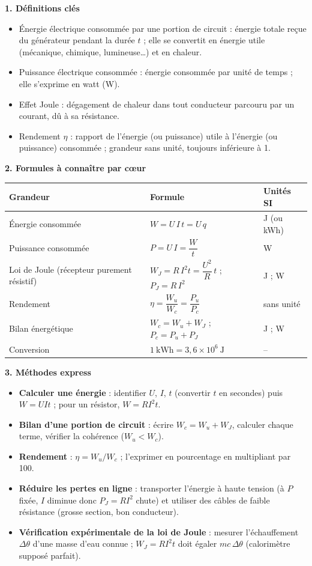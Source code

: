 \documentclass[11pt]{article}
\newcommand{\cle}[1]{{\popxbold\color{popdark}#1}}
\begin{document}
\begin{bilan}
\textbf{1. Définitions clés}
\begin{itemize}
\item \cle{Énergie électrique consommée} par une portion de circuit : énergie totale reçue du générateur pendant la durée $t$ ; elle se convertit en énergie utile (mécanique, chimique, lumineuse\ldots) et en chaleur.
\item \cle{Puissance électrique consommée} : énergie consommée par unité de temps ; elle s'exprime en watt (W).
\item \cle{Effet Joule} : dégagement de chaleur dans tout conducteur parcouru par un courant, dû à sa résistance.
\item \cle{Rendement} $\eta$ : rapport de l'énergie (ou puissance) utile à l'énergie (ou puissance) consommée ; grandeur sans unité, toujours inférieure à 1.
\end{itemize}

\textbf{2. Formules à connaître par c\oe ur}
\begin{center}
\begin{tabularx}{\linewidth}{|l|X|l|}
\hline
\rowcolor{popblueL} \textbf{Grandeur} & \textbf{Formule} & \textbf{Unités SI} \\
\hline
Énergie consommée & $W = U\,I\,t = U\,q$ & J (ou kWh) \\
\hline
Puissance consommée & $P = U\,I = \dfrac{W}{t}$ & W \\
\hline
Loi de Joule (récepteur purement résistif) & $W_J = R\,I^2 t = \dfrac{U^2}{R}\,t$ \;;\; $P_J = R\,I^2$ & J ; W \\
\hline
Rendement & $\eta = \dfrac{W_u}{W_c} = \dfrac{P_u}{P_c}$ & sans unité \\
\hline
Bilan énergétique & $W_c = W_u + W_J$ \;;\; $P_c = P_u + P_J$ & J ; W \\
\hline
Conversion & $1\ \text{kWh} = 3{,}6\times 10^{6}\ \text{J}$ & -- \\
\hline
\end{tabularx}
\end{center}

\textbf{3. Méthodes express}
\begin{itemize}
\item \textbf{Calculer une énergie} : identifier $U$, $I$, $t$ (convertir $t$ en secondes) puis $W = UIt$ ; pour un résistor, $W = RI^2t$.
\item \textbf{Bilan d'une portion de circuit} : écrire $W_c = W_u + W_J$, calculer chaque terme, vérifier la cohérence ($W_u < W_c$).
\item \textbf{Rendement} : $\eta = W_u/W_c$ ; l'exprimer en pourcentage en multipliant par 100.
\item \textbf{Réduire les pertes en ligne} : transporter l'énergie à haute tension (à $P$ fixée, $I$ diminue donc $P_J = RI^2$ chute) et utiliser des câbles de faible résistance (grosse section, bon conducteur).
\item \textbf{Vérification expérimentale de la loi de Joule} : mesurer l'échauffement $\Delta\theta$ d'une masse d'eau connue ; $W_J = RI^2t$ doit égaler $mc\,\Delta\theta$ (calorimètre supposé parfait).
\end{itemize}
\end{bilan}
\end{document}
